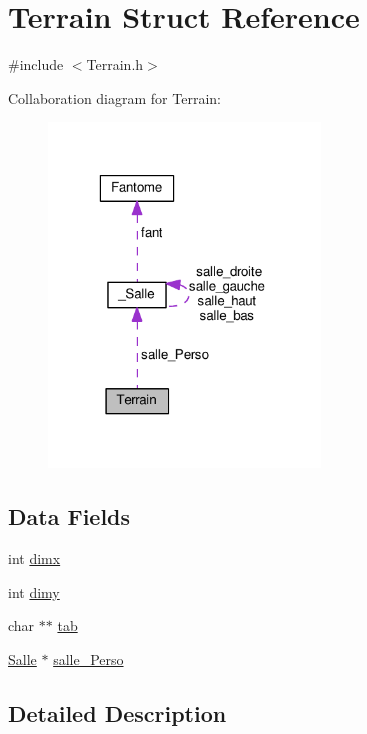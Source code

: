 \hypertarget{struct_terrain}{\section{Terrain Struct Reference}
\label{struct_terrain}
}


{\ttfamily \#include $<$Terrain.\-h$>$}



Collaboration diagram for Terrain\-:\nopagebreak
\begin{figure}[H]
\begin{center}
\leavevmode
\includegraphics[width=205pt]{struct_terrain__coll__graph}
\end{center}
\end{figure}
\subsection*{Data Fields}
\begin{DoxyCompactItemize}
\item 
int \hyperlink{struct_terrain_a8b0f6ae031a507c3ffb7bf0eec290d46}{dimx}
\item 
int \hyperlink{struct_terrain_a3a072d6ef9c51d085b44eac70f2edff6}{dimy}
\item 
char $\ast$$\ast$ \hyperlink{struct_terrain_a095ef5f32e2dd3c36f801fc514372ee3}{tab}
\item 
\hyperlink{_terrain_8h_a00ea6820934a8f863026cfbfad337db8}{Salle} $\ast$ \hyperlink{struct_terrain_ad00556a521b6c4ae8221f3c9e361cc03}{salle\-\_\-\-Perso}
\end{DoxyCompactItemize}


\subsection{Detailed Description}



